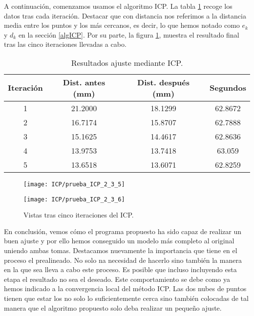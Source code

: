 A continuación, comenzamos usamos el algoritmo ICP. La tabla \ref{table:ICP2} recoge los datos tras cada iteración. Destacar que con distancia nos referimos a la distancia media entre los puntos y los más cercanos, es decir, lo que hemos notado como $ e_k $ y $ d_k $ en la sección \ref{algICP}. Por su parte, la figura \ref{fig:subim2}, muestra el resultado final tras las cinco iteraciones llevadas a cabo. \\

\begin{table}[h!]
	\centering
	\begin{tabular}{| c | c | c | c |} 
		\hline
		Iteración & Dist. antes (mm)  & Dist. después (mm) & Segundos \\
		\hline
		1 & 21.2000 & 18.1299 & 62.8672\\		 
		2 & 16.7174 &  15.8707 &  62.7888\\	
		3 & 15.1625 & 14.4617  & 62.8636\\
		4 & 13.9753 &  13.7418 & 63.059\\
		5 &  13.6518 &  13.6071 & 62.8259\\
		\hline
	\end{tabular}
	\caption{Resultados ajuste mediante ICP.}
	\label{table:ICP2}
\end{table}

\begin{figure}[h!]
	
	\begin{minipage}[b]{0.5\textwidth}
		\centering
		\texttt{[image: ICP/prueba\_ICP\_2\_3\_5]} 
	\end{minipage}
	\begin{minipage}[b]{0.5\textwidth}
		\centering
		\texttt{[image: ICP/prueba\_ICP\_2\_3\_6]}
	\end{minipage}
	\caption{Vistas tras cinco iteraciones del ICP.}
	\label{fig:subim2}
\end{figure}
En conclusión, vemos cómo el programa propuesto ha sido capaz de realizar un buen ajuste y por ello hemos conseguido un modelo más completo al original uniendo ambas tomas. Destacamos nuevamente la importancia que tiene en el proceso el prealineado. No solo na necesidad de hacerlo sino también la manera en la que sea lleva a cabo este proceso. Es posible que incluso incluyendo esta etapa el resultado no sea el deseado. Este comportamiento se debe como  ya hemos indicado a la convergencia local del método ICP. Las dos nubes de puntos tienen que estar los no solo lo suficientemente cerca sino también colocadas de tal manera que el algoritmo propuesto solo deba realizar un pequeño ajuste. \\

